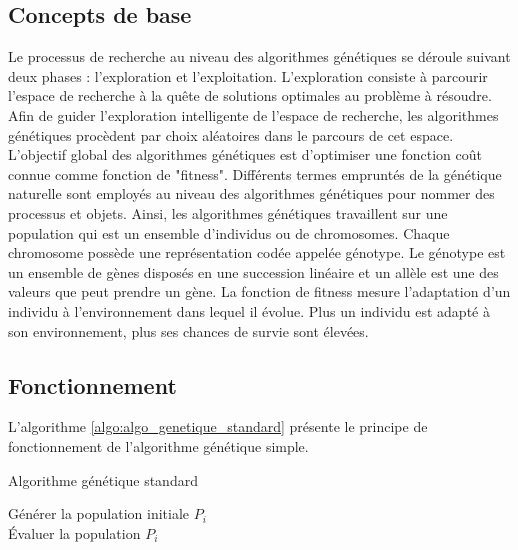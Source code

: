 	\subsection{Concepts de base}
	Le processus de recherche au niveau des algorithmes génétiques se déroule suivant deux phases : l’exploration et l’exploitation. L'exploration consiste à parcourir l'espace de recherche à la quête de solutions optimales au problème à résoudre. Afin de guider l'exploration intelligente de l'espace de recherche, les algorithmes génétiques procèdent par choix aléatoires dans le parcours de cet espace. L'objectif global des algorithmes génétiques est d'optimiser une fonction coût connue comme fonction de "fitness".
	Différents termes empruntés de la génétique naturelle sont employés au niveau des algorithmes génétiques pour nommer des processus et objets. Ainsi, les algorithmes génétiques travaillent sur une population qui est un ensemble d'individus ou de chromosomes. Chaque chromosome possède une représentation codée appelée génotype. Le génotype est un ensemble de gènes disposés en une succession linéaire et un allèle est une des valeurs que peut prendre un gène. La fonction de fitness mesure l'adaptation d'un individu à l'environnement dans lequel il évolue. Plus un individu est adapté à son environnement, plus ses chances de survie sont élevées.

	\subsection{Fonctionnement}
	
	L'algorithme \ref{algo:algo_genetique_standard} présente le principe de fonctionnement de l'algorithme génétique simple.\\
	 
	\begin{algorithm}[H]
 	\caption{Algorithme génétique standard \cite{Goncalves}}
 	\label{algo:algo_genetique_standard}
 	Générer la population initiale $P_{i}$ \\
 	Évaluer la population $P_{i}$ \\
	\end{algorithm}
	
